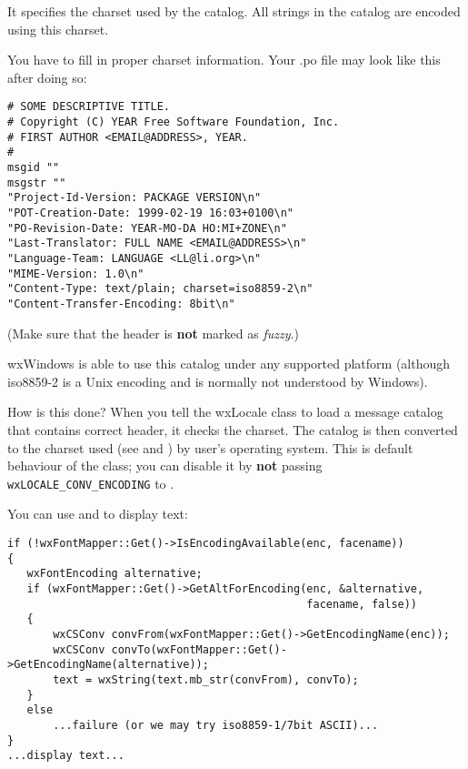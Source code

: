 It specifies the charset used by the catalog. All strings in the catalog
are encoded using this charset.

You have to fill in proper charset information. Your .po file may look like this
after doing so: 

\begin{verbatim}
# SOME DESCRIPTIVE TITLE.
# Copyright (C) YEAR Free Software Foundation, Inc.
# FIRST AUTHOR <EMAIL@ADDRESS>, YEAR.
#
msgid ""
msgstr ""
"Project-Id-Version: PACKAGE VERSION\n"
"POT-Creation-Date: 1999-02-19 16:03+0100\n"
"PO-Revision-Date: YEAR-MO-DA HO:MI+ZONE\n"
"Last-Translator: FULL NAME <EMAIL@ADDRESS>\n"
"Language-Team: LANGUAGE <LL@li.org>\n"
"MIME-Version: 1.0\n"
"Content-Type: text/plain; charset=iso8859-2\n"
"Content-Transfer-Encoding: 8bit\n"
\end{verbatim}

(Make sure that the header is {\bf not} marked as {\it fuzzy}.)

wxWindows is able to use this catalog under any supported platform
(although iso8859-2 is a Unix encoding and is normally not understood by
Windows).

How is this done? When you tell the wxLocale class to load a message catalog that
contains correct header, it checks the charset. The catalog is then converted
to the charset used (see
 and
) by
user's operating system. This is default behaviour of the
 class; you can disable it by {\bf not} passing
{\tt wxLOCALE\_CONV\_ENCODING} to .


You can use  and 
 to display text:

\begin{verbatim}
if (!wxFontMapper::Get()->IsEncodingAvailable(enc, facename))
{
   wxFontEncoding alternative;
   if (wxFontMapper::Get()->GetAltForEncoding(enc, &alternative,
                                              facename, false))
   {
       wxCSConv convFrom(wxFontMapper::Get()->GetEncodingName(enc));
       wxCSConv convTo(wxFontMapper::Get()->GetEncodingName(alternative));
       text = wxString(text.mb_str(convFrom), convTo);
   }
   else
       ...failure (or we may try iso8859-1/7bit ASCII)...
}
...display text...
\end{verbatim}

